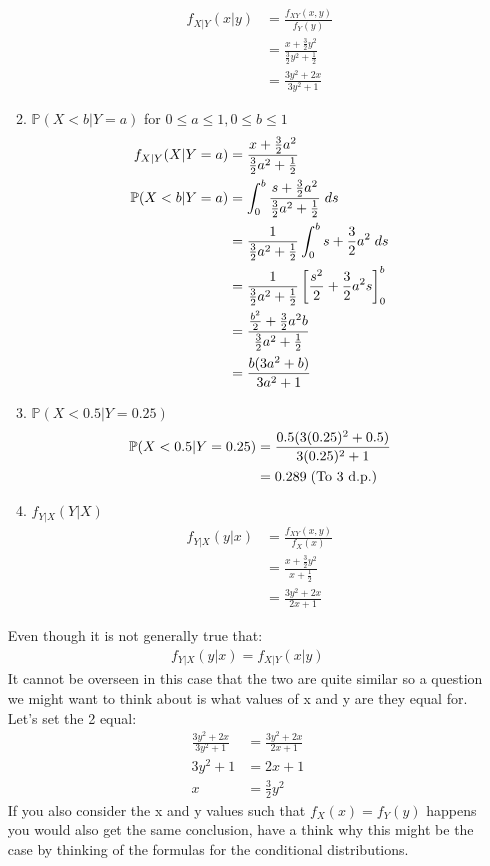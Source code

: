 \documentclass[,oneside]{article}
\begin{document}
\begin{enumerate}
\begin{enumerate}
\begin{align*}
f_{X|Y}(x|y)&=\frac{f_{XY}(x,y)}{f_Y(y)}\\
&=\frac{x+\frac{3}{2}y^2}{\frac{3}{2}y^2+\frac{1}{2}}\\
&=\frac{3y^2+2x}{3y^2+1}
\end{align*}
\item $\mathbb{P}(X < b | Y = a)$ for $0 \leq a \leq 1, 0 \leq b \leq 1$ 
\begin{align*}
f_{X|Y}(X|Y=a)&=\frac{x+\frac{3}{2}a^2}{\frac{3}{2}a^2+\frac{1}{2}}\\
\mathbb{P}(X < b | Y = a)&=\int_{0}^{b}\frac{s+\frac{3}{2}a^2}{\frac{3}{2}a^2+\frac{1}{2}}\hspace{0.1cm}ds\\
&=\frac{1}{\frac{3}{2}a^2+\frac{1}{2}}\int_{0}^{b}s+\frac{3}{2}a^2 \hspace{0.1cm}ds\\
&=\frac{1}{\frac{3}{2}a^2+\frac{1}{2}} \left [ \frac{s^2}{2}+\frac{3}{2}a^2 s \right]_{0}^{b}\\
&=\frac{\frac{b^2}{2}+\frac{3}{2}a^2 b }{\frac{3}{2}a^2+\frac{1}{2}}\\
&=\frac{b(3a^2+b)}{3a^2+1}
\end{align*}
\item $\mathbb{P}(X < 0.5 | Y = 0.25)$
\begin{align*}
\mathbb{P}(X < 0.5 | Y = 0.25)&=\frac{0.5(3(0.25)^2+0.5)}{3(0.25)^2+1}\\
&= 0.289 \hspace{0.1cm}\text{(To 3 d.p.)}
\end{align*}
\item $f_{Y|X}(Y|X)$
\begin{align*}
f_{Y|X}(y|x)&=\frac{f_{XY}(x,y)}{f_X(x)}\\
&=\frac{x+\frac{3}{2}y^2}{x+\frac{1}{2}}\\
&=\frac{3y^2+2x}{2x+1}
\end{align*}
\end{enumerate}
Even though it is not generally true that:
\begin{align*}
f_{Y|X}(y|x)=f_{X|Y}(x|y)
\end{align*}
It cannot be overseen in this case that the two are quite similar so a question we might want to think about is what values of x and y are they equal for. Let's set the 2 equal:
\begin{align*}
\frac{3y^2+2x}{3y^2+1}&=\frac{3y^2+2x}{2x+1}\\
3y^2+1&=2x+1\\
x&=\frac{3}{2}y^2
\end{align*}
If you also consider the x and y values such that $f_X(x)=f_Y(y)$ happens you would also get the same conclusion, have a think why this might be the case by thinking of the formulas for the conditional distributions.

\end{enumerate}
\end{document}
